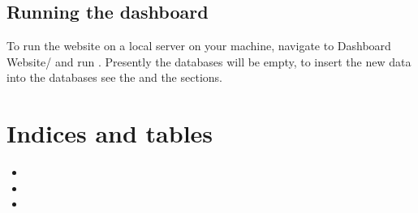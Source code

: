 \documentclass[letterpaper,10pt,english]{sphinxmanual}
\begin{document}
\section{Running the dashboard}
\label{\detokenize{running:running-the-dashboard}}
To run the website on a local server on your machine, navigate to Dashboard Website/ and run . Presently the databases will be empty, to insert the new data into the databases see the {\hyperref[\detokenize{mongoDB_data_ingestion:ingesting-data-into-mongodb}]{}} and the {\hyperref[\detokenize{neo4j_data_ingestion:ingesting-data-into-neo4j}]{}} sections.


\chapter{Indices and tables}
\label{\detokenize{index:indices-and-tables}}\begin{itemize}
\item {} 

\item {} 

\item {} 

\end{itemize}



\renewcommand{\indexname}{Index}
\printindex
\end{document}
